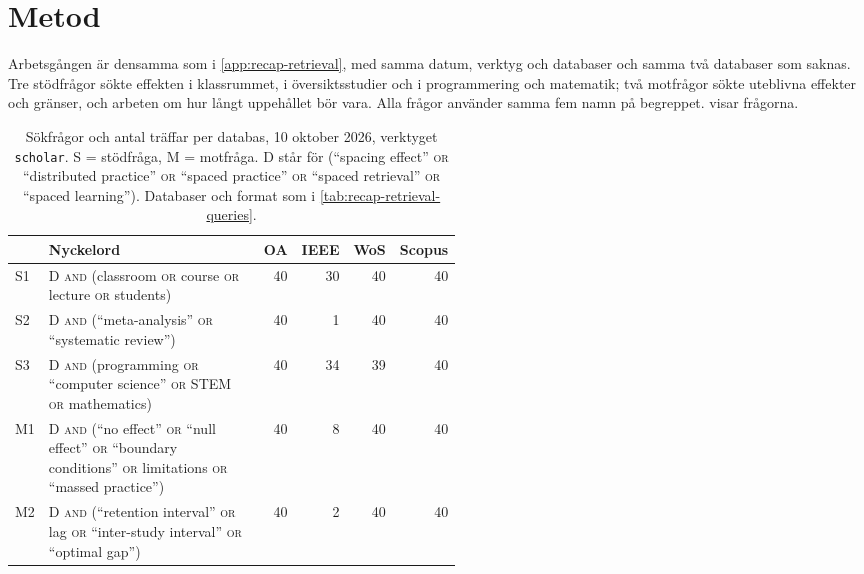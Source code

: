 \section{Metod}
\label{sec:recap-spacing-metod}

Arbetsgången är densamma som i \cref{app:recap-retrieval}, med samma
datum, verktyg och databaser och samma två databaser som saknas.  Tre
stödfrågor sökte effekten i klassrummet, i översiktsstudier och i
programmering och matematik; två motfrågor sökte uteblivna effekter och
gränser, och arbeten om hur långt uppehållet bör vara.  Alla frågor
använder samma fem namn på begreppet.  
visar frågorna.

\begin{table}[htbp]
  \centering
  \caption{Sökfrågor och antal träffar per databas, 10 oktober 2026,
    verktyget \texttt{scholar}.  S = stödfråga, M = motfråga.  D står
    för (\enquote{spacing effect} \textsc{or} \enquote{distributed
    practice} \textsc{or} \enquote{spaced practice} \textsc{or}
    \enquote{spaced retrieval} \textsc{or} \enquote{spaced learning}).
    Databaser och format som i \cref{tab:recap-retrieval-queries}.}
  \label{tab:recap-spacing-queries}
  \footnotesize
  \begin{tabular}{@{}lp{0.52\linewidth}rrrr@{}}
    \toprule
    & Nyckelord & OA & IEEE & WoS & Scopus \\
    \midrule
    S1 & D \textsc{and} (classroom \textsc{or} course \textsc{or} lecture
      \textsc{or} students)
      & 40 & 30 & 40 & 40 \\
    S2 & D \textsc{and} (\enquote{meta-analysis} \textsc{or}
      \enquote{systematic review})
      & 40 & 1 & 40 & 40 \\
    S3 & D \textsc{and} (programming \textsc{or} \enquote{computer
      science} \textsc{or} STEM \textsc{or} mathematics)
      & 40 & 34 & 39 & 40 \\
    M1 & D \textsc{and} (\enquote{no effect} \textsc{or} \enquote{null
      effect} \textsc{or} \enquote{boundary conditions} \textsc{or}
      limitations \textsc{or} \enquote{massed practice})
      & 40 & 8 & 40 & 40 \\
    M2 & D \textsc{and} (\enquote{retention interval} \textsc{or} lag
      \textsc{or} \enquote{inter-study interval} \textsc{or}
      \enquote{optimal gap})
      & 40 & 2 & 40 & 40 \\
    \bottomrule
  \end{tabular}
\end{table}

